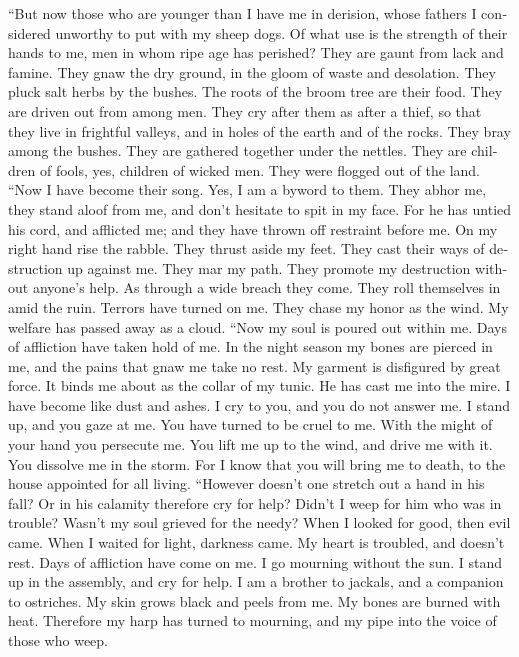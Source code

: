 \begin{paracol}{2}
\begin{otherlanguage}{english}
 ``But now those who are younger than I have me in
derision, whose fathers I considered unworthy to put with my sheep dogs.
 Of what use is the strength of their hands to me, men in
whom ripe age has perished?  They are gaunt from lack and
famine. They gnaw the dry ground, in the gloom of waste and desolation.
 They pluck salt herbs by the bushes. The roots of the
broom tree are their food.  They are driven out from among
men. They cry after them as after a thief,  so that they
live in frightful valleys, and in holes of the earth and of the rocks.
 They bray among the bushes. They are gathered together
under the nettles.  They are children of fools, yes,
children of wicked men. They were flogged out of the land.
 ``Now I have become their song. Yes, I am a byword to
them.  They abhor me, they stand aloof from me, and don't
hesitate to spit in my face.  For he has untied his cord,
and afflicted me; and they have thrown off restraint before me.
 On my right hand rise the rabble. They thrust aside my
feet. They cast their ways of destruction up against me. 
They mar my path. They promote my destruction without anyone's help.
 As through a wide breach they come. They roll themselves
in amid the ruin.  Terrors have turned on me. They chase
my honor as the wind. My welfare has passed away as a cloud.
 ``Now my soul is poured out within me. Days of
affliction have taken hold of me.  In the night season my
bones are pierced in me, and the pains that gnaw me take no rest.
 My garment is disfigured by great force. It binds me
about as the collar of my tunic.  He has cast me into the
mire. I have become like dust and ashes.  I cry to you,
and you do not answer me. I stand up, and you gaze at me.
 You have turned to be cruel to me. With the might of
your hand you persecute me.  You lift me up to the wind,
and drive me with it. You dissolve me in the storm.  For
I know that you will bring me to death, to the house appointed for all
living.  ``However doesn't one stretch out a hand in his
fall? Or in his calamity therefore cry for help?  Didn't
I weep for him who was in trouble? Wasn't my soul grieved for the needy?
 When I looked for good, then evil came. When I waited
for light, darkness came.  My heart is troubled, and
doesn't rest. Days of affliction have come on me.  I go
mourning without the sun. I stand up in the assembly, and cry for help.
 I am a brother to jackals, and a companion to ostriches.
 My skin grows black and peels from me. My bones are
burned with heat.  Therefore my harp has turned to
mourning, and my pipe into the voice of those who weep.


\end{otherlanguage}
\end{paracol}
